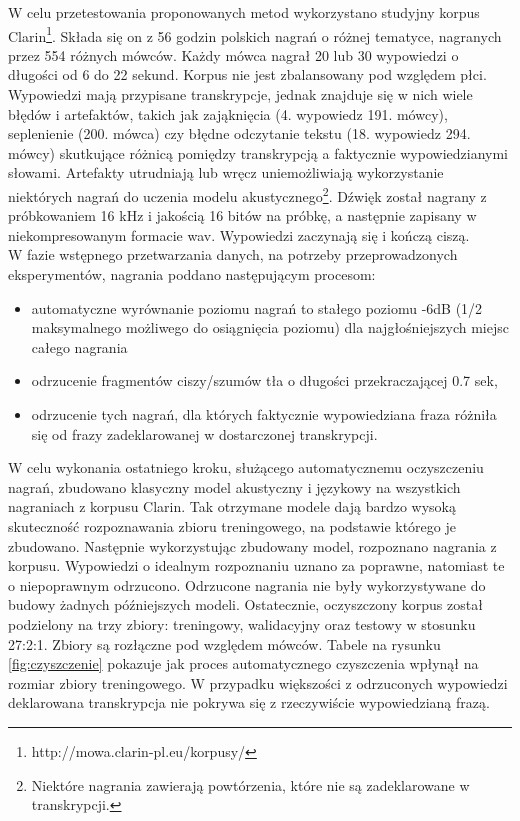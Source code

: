 \documentclass[shortabstract, mgr]{iithesis}
\begin{document}
	W celu przetestowania proponowanych metod wykorzystano studyjny korpus Clarin\footnote{http://mowa.clarin-pl.eu/korpusy/}. Składa się on z 56 godzin polskich nagrań o różnej tematyce, nagranych przez 554 różnych mówców. Każdy mówca nagrał 20 lub 30 wypowiedzi o długości od 6 do 22 sekund. Korpus nie jest zbalansowany pod względem płci. Wypowiedzi mają przypisane transkrypcje, jednak znajduje się w nich wiele błędów i artefaktów, takich jak zająknięcia (4. wypowiedz 191. mówcy), seplenienie (200. mówca) czy błędne odczytanie tekstu (18. wypowiedz 294. mówcy) skutkujące różnicą pomiędzy transkrypcją a faktycznie wypowiedzianymi słowami. Artefakty utrudniają lub wręcz uniemożliwiają wykorzystanie niektórych nagrań do uczenia modelu akustycznego\footnote{Niektóre nagrania zawierają powtórzenia, które nie są zadeklarowane w transkrypcji.}. Dźwięk został nagrany z próbkowaniem 16 kHz i jakością 16 bitów na próbkę, a następnie zapisany w niekompresowanym formacie wav. Wypowiedzi zaczynają się i kończą ciszą. 
	\\
	W fazie wstępnego przetwarzania danych, na potrzeby przeprowadzonych eksperymentów, nagrania poddano następującym procesom:
	\begin{itemize}
		\item automatyczne wyrównanie poziomu nagrań to stałego poziomu -6dB (1/2 maksymalnego możliwego do osiągnięcia poziomu) dla najgłośniejszych miejsc całego nagrania
		\item odrzucenie fragmentów ciszy/szumów tła o długości przekraczającej 0.7 sek,
		\item odrzucenie tych nagrań, dla których faktycznie wypowiedziana fraza różniła się od frazy zadeklarowanej w dostarczonej transkrypcji.
	\end{itemize}
	W celu wykonania ostatniego kroku, służącego automatycznemu oczyszczeniu nagrań, zbudowano klasyczny model akustyczny i językowy na wszystkich nagraniach z korpusu Clarin. Tak otrzymane modele dają bardzo wysoką skuteczność rozpoznawania zbioru treningowego, na podstawie którego je zbudowano. Następnie wykorzystując zbudowany model, rozpoznano nagrania z korpusu. Wypowiedzi o idealnym rozpoznaniu uznano za poprawne, natomiast te o niepoprawnym odrzucono. Odrzucone nagrania nie były wykorzystywane do budowy żadnych późniejszych modeli. 
	Ostatecznie, oczyszczony korpus został podzielony na trzy zbiory: treningowy, walidacyjny oraz testowy w stosunku 27:2:1. Zbiory są rozłączne pod względem mówców. Tabele na rysunku \ref{fig:czyszczenie} pokazuje jak proces automatycznego czyszczenia wpłynął na rozmiar zbiory treningowego. W przypadku większości z odrzuconych wypowiedzi deklarowana transkrypcja nie pokrywa się z rzeczywiście wypowiedzianą frazą.
	
\end{document}
